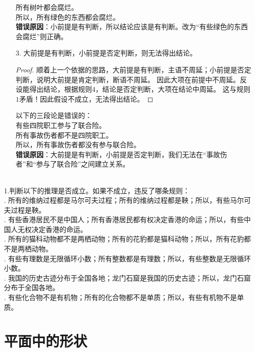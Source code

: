 \documentclass[12pt,UTF8,fontset=none]{ctexbook}
\begin{document}
\begin{enumerate}
\begin{ex*}
        \indent 所有树叶都会腐烂。\\
        \indent 所以，所有绿色的东西都会腐烂。\\
        \textbf{错误原因}：小前提是有判断，所以结论应该是有判断。改为“有些绿色的东西会腐烂”则正确。
    \end{ex*}
    \item[3.] 大前提是有判断，小前提是否定判断，则无法得出结论。
    \begin{proof}
        顺着上一个依据的思路，大前提是有判断，主语不周延；小前提是否定判断，说明大前提是肯定判断，断语不周延。
        因此大项在前提中不周延。反设能得出结论，根据规则$4$，结论是否定判断，大项在结论中周延。
        这与规则$1$矛盾！因此假设不成立，无法得出结论。
    \end{proof}
    \begin{ex*}
        以下的三段论是错误的： \\
        \indent 有些四院职工参与了联合险。\\
        \indent 所有事故伤者都不是四院职工。\\
        \indent 所以，所有事故伤者都没有参与联合险。\\
        \textbf{错误原因}：大前提是有判断，小前提是否定判断，我们无法在“事故伤者”和“参与了联合险”之间建立关系。
    \end{ex*}
\end{enumerate}
\begin{xt}\label{xt:0-1-10}
    \mbox{} \\
    \indent 1.判断以下的推理是否成立。如果不成立，违反了哪条规则：\\
    . 所有的维纳过程都是马尔可夫过程；所有的维纳过程都是鞅；所以，有些马尔可夫过程是鞅。\\
    . 有些香港居民不是中国人；所有香港居民都有权决定香港的命运；所以，有些中国人无权决定香港的命运。\\
    . 所有的猫科动物都不是两栖动物；所有的花豹都是猫科动物；所以，所有花豹都不是两栖动物。\\
    . 有些有理数是无限循环小数；所有整数都是有理数；所以，有些整数是无限循环小数。\\
    . 我国的历史古迹分布于全国各地；龙门石窟是我国的历史古迹；所以，龙门石窟分布于全国各地。\\
    . 有些化合物不是有机物；所有的化合物都不是单质；所以，有些有机物不是单质。    
\end{xt}

\chapter{平面中的形状}
\end{document}
